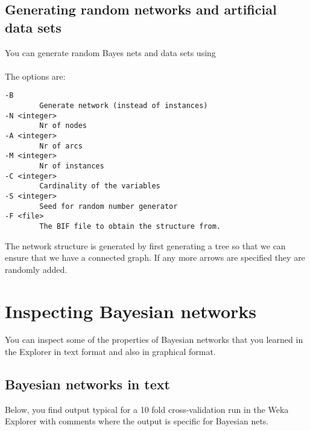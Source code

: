 \subsection*{Generating random networks and artificial data sets}

You can generate random Bayes nets and data sets using \\
 \\
The options are:
\begin{verbatim}
-B
        Generate network (instead of instances)
-N <integer>
        Nr of nodes
-A <integer>
        Nr of arcs
-M <integer>
        Nr of instances
-C <integer>
        Cardinality of the variables
-S <integer>
        Seed for random number generator
-F <file>
        The BIF file to obtain the structure from.
\end{verbatim}

The network structure is generated by first generating a tree so that we can
ensure that we have a connected graph. If any more arrows are specified they are
randomly added.


\section{Inspecting Bayesian networks}

You can inspect some of the properties of Bayesian networks that you learned
in the Explorer in text format and also in graphical format.
  
\subsection*{Bayesian networks in text}

Below, you find output typical for a 10 fold cross-validation run in the Weka
Explorer with comments where the output is specific for Bayesian nets. 


